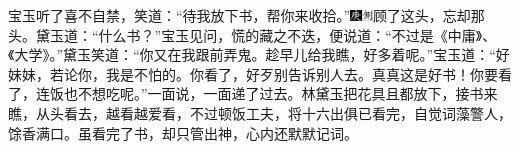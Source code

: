 宝玉听了喜不自禁，笑道：“待我放下书，帮你来收拾。”{\includegraphics[width=3mm]{../Images/00004}\includegraphics[width=3mm]{../Images/00011}\footnotesize \kaishu 顾了这头，忘却那头。}黛玉道：“什么书？”宝玉见问，慌的藏之不迭，便说道：“不过是《中庸》、《大学》。”黛玉笑道：“你又在我跟前弄鬼。趁早儿给我瞧，好多着呢。”宝玉道：“好妹妹，若论你，我是不怕的。你看了，好歹别告诉别人去。真真这是好书！你要看了，连饭也不想吃呢。”一面说，一面递了过去。林黛玉把花具且都放下，接书来瞧，从头看去，越看越爱看，不过顿饭工夫，将十六出俱已看完，自觉词藻警人，馀香满口。虽看完了书，却只管出神，心内还默默记词。

